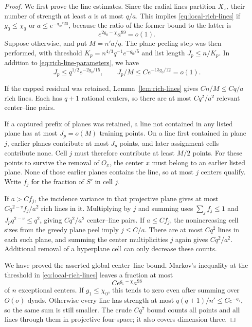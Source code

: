 \begin{proof}
We first prove the line estimates.  Since the radial lines partition
$X_x$, their number of strength at least $a$ is at most $q/a$.  This
implies \eqref{eq:local-rich-lines} if $g_0\le\chi_0$ or
$a\le e^{-g_0/20}$, because the ratio of the former bound to the latter
is
\[
 e^{2g_0-\chi}a^{99}=o(1).
\]
Suppose otherwise, and put $M=n'a/q$.  The plane-peeling step was then
performed, with threshold
$K_p=n^{4/3}q^{-1}e^{-g_0/5}$ and list length
$J_p\le n/K_p$.  In addition to
\eqref{eq:rich-line-parameters}, we have
\begin{equation}\label{eq:plane-list-length}
 J_p\le q^{1/2}e^{-2g_0/15},\qquad J_p/M\le C e^{-13g_0/12}=o(1).
\end{equation}

If the capped residual was retained, Lemma~\ref{lem:rich-lines} gives
$Cn/M\le Cq/a$ rich lines.  Each has $q+1$ rational centers, so there
are at most $Cq^2/a^2$ relevant center--line pairs.

If a captured prefix of planes was retained, a line not contained in any
listed plane has at most $J_p=o(M)$ training points.  On a line first
contained in plane $j$, earlier planes contribute at most $J_p$ points,
and later assignment cells contribute none.  Cell $j$ must therefore
contribute at least $M/2$ points.  For these points to survive the removal
of $O_x$, the center $x$ must belong to an earlier listed plane.  None of
those earlier planes contains the line, so at most $j$ centers qualify.
Write $f_j$ for the fraction of $S'$ in cell $j$.

If $a>Cf_j$, the incidence variance in that projective plane gives at
most $Cq^{2-v}f_j/a^2$ rich lines in it.  Multiplying by $j$ and summing
uses $\sum_j f_j\le1$ and $J_pq^{2-v}\le q^2$, giving $Cq^2/a^2$
center--line pairs.  If $a\le Cf_j$, the nonincreasing cell sizes from
the greedy plane peel imply $j\le C/a$.  There are at most $Cq^2$ lines
in each such plane, and summing the center multiplicities $j$ again gives
$Cq^2/a^2$.  Additional removal of a hyperplane cell can only decrease
these counts.

We have proved the asserted global center--line bound.  Markov's
inequality at the threshold in \eqref{eq:local-rich-lines} leaves a
fraction at most
\begin{equation}\label{eq:line-exception-fraction}
 C e^{g_1-\chi}a^{98}
\end{equation}
of $n$ exceptional centers.  If $g_1\le\chi_0$, this tends to zero even
after summing over $O(\sigma)$ dyads.  Otherwise every line has strength
at most $q(q+1)/n'\le Ce^{-g_1}$, so the same sum is still smaller.
The crude $Cq^7$ bound counts all points and all lines through them in
projective four-space; it also covers dimension three.


\end{proof}
